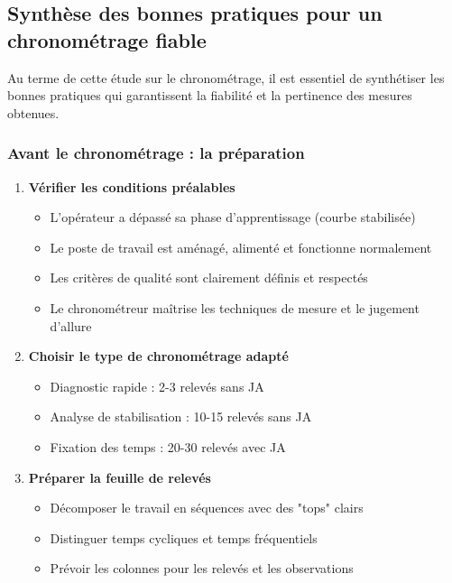 \documentclass[a4paper,12pt]{article}
\begin{document}
\subsection*{Synthèse des bonnes pratiques pour un chronométrage fiable}

Au terme de cette étude sur le chronométrage, il est essentiel de synthétiser les bonnes pratiques qui garantissent la fiabilité et la pertinence des mesures obtenues.

\subsubsection*{Avant le chronométrage : la préparation}

\begin{enumerate}
    \item \textbf{Vérifier les conditions préalables}
    \begin{itemize}
        \item L'opérateur a dépassé sa phase d'apprentissage (courbe stabilisée)
        \item Le poste de travail est aménagé, alimenté et fonctionne normalement
        \item Les critères de qualité sont clairement définis et respectés
        \item Le chronométreur maîtrise les techniques de mesure et le jugement d'allure
    \end{itemize}
    
    \item \textbf{Choisir le type de chronométrage adapté}
    \begin{itemize}
        \item Diagnostic rapide : 2-3 relevés sans JA
        \item Analyse de stabilisation : 10-15 relevés sans JA
        \item Fixation des temps : 20-30 relevés avec JA
    \end{itemize}
    
    \item \textbf{Préparer la feuille de relevés}
    \begin{itemize}
        \item Décomposer le travail en séquences avec des "tops" clairs
        \item Distinguer temps cycliques et temps fréquentiels
        \item Prévoir les colonnes pour les relevés et les observations
    \end{itemize}
\end{enumerate}
\end{document}
